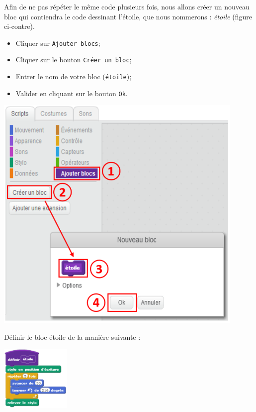 

\vspace{1cm}

\begin{minipage}[c]{0.55\linewidth}
Afin de ne pas répéter le même code plusieurs fois, nous allons créer un nouveau bloc qui contiendra le code dessinant l’étoile, que nous nommerons : \emph{étoile} (figure ci-contre).

\vspace{6pt}

  \begin{itemize}
    \item {} Cliquer sur \texttt{Ajouter blocs};
    \item {} Cliquer sur le bouton \texttt{Créer un bloc};
    \item {} Entrer le nom de votre bloc (\texttt{étoile});
    \item {} Valider en cliquant sur le bouton \texttt{Ok}.
  \end{itemize}
\end{minipage} \hfill%
\begin{minipage}[c]{0.38\linewidth}
  \includegraphics[width=0.9\textwidth]{./images/scratch03/fonction/Scratch_Fonctions_06}
\end{minipage}

Définir le bloc étoile de la manière suivante : 
 \begin{center}
 \includegraphics[width=0.25\textwidth]{./images/scratch03/fonction/Scratch_Fonctions_07}
 \end{center}

